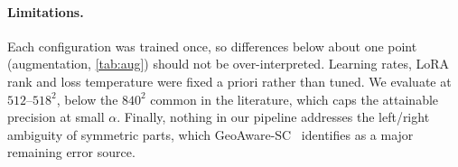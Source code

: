 \paragraph{Limitations.}
Each configuration was trained once, so differences below about one point (\eg augmentation, \cref{tab:aug}) should not be over-interpreted. Learning rates, LoRA rank and loss temperature were fixed a priori rather than tuned. We evaluate at $512$--$518^2$, below the $840^2$ common in the literature, which caps the attainable precision at small $\alpha$. Finally, nothing in our pipeline addresses the left/right ambiguity of symmetric parts, which GeoAware-SC~\cite{zhang2024telling} identifies as a major remaining error source.
